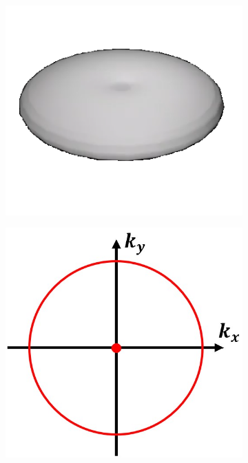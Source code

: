 \begin{figure}[h]
	\centering
	\begin{subfigure}[t]{0.25\textwidth}
		\centering
		\includegraphics[width=\linewidth]{images/3D_SIM_OTF_no_angle.png}
		\caption{}
		\label{fig:3D_SIM_OTF_no_angle}
	\end{subfigure}
	\begin{subfigure}[t]{0.25\textwidth}
		\centering
		\includegraphics[width=\linewidth]{images/3D_SIM_OTF_no_angle_2D_plot_xy.jpg}

\end{subfigure}
\end{figure}
